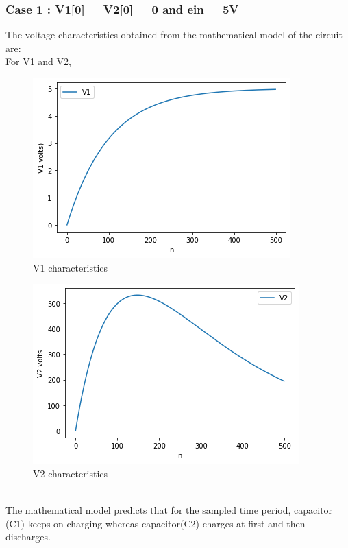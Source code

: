 \documentclass[10pt,journal,cspaper,compsoc]{IEEEtran}
\begin{document}
  \subsubsection*{Case 1 : V1[0] = V2[0] = 0 and ein = 5V}
  The voltage characteristics obtained from the mathematical model of the circuit are:\\
  For V1 and V2,\\
  \begin{figure}[ht]
    \centering
    \includegraphics[scale = 0.44]{images/Exp2_Example1_V1.png}
    \caption{V1 characteristics}
  \end{figure}
  \begin{figure}[h!]
    \centering
    \includegraphics[scale = 0.5]{images/Exp2_Example1_V2.png}
    \caption{V2 characteristics}
  \end{figure}
  \\The mathematical model predicts that for the sampled time period, capacitor (C1) keeps on charging whereas capacitor(C2) charges at first and then discharges. 
\end{document}
